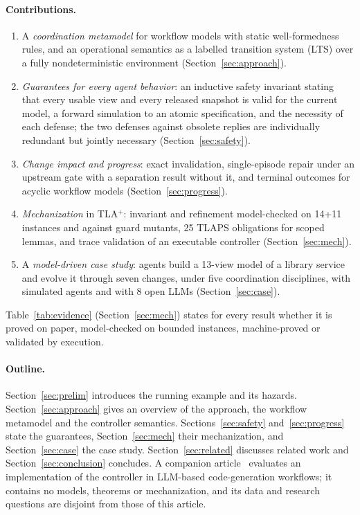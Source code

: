\documentclass[pdflatex,sn-mathphys-num]{sn-jnl}
\theoremstyle{thmstyleone}%
\theoremstyle{thmstyletwo}%
\theoremstyle{thmstylethree}%
\newcommand{\tla}{TLA$^+$}
\newcommand{\TLCExtBaselines}{14}
\newcommand{\ProvedObligations}{25}
\newcommand{\LlmModels}{8}
\newcommand{\TLCScaleBaselines}{11}
\begin{document}
\paragraph{Contributions.}
\begin{enumerate}
\item A \emph{coordination metamodel} for workflow models with static well-formedness rules, and an operational semantics as a labelled transition system (LTS) over a fully nondeterministic environment (Section~\ref{sec:approach}).
\item \emph{Guarantees for every agent behavior}: an inductive safety invariant stating that every usable view and every released snapshot is valid for the current model, a forward simulation to an atomic specification, and the necessity of each defense; the two defenses against obsolete replies are individually redundant but jointly necessary (Section~\ref{sec:safety}).
\item \emph{Change impact and progress}: exact invalidation, single-episode repair under an upstream gate with a separation result without it, and terminal outcomes for acyclic workflow models (Section~\ref{sec:progress}).
\item \emph{Mechanization} in \tla{}: invariant and refinement model-checked on \TLCExtBaselines{}+\TLCScaleBaselines{} instances and against guard mutants, \ProvedObligations{} TLAPS obligations for scoped lemmas, and trace validation of an executable controller (Section~\ref{sec:mech}).
\item A \emph{model-driven case study}: agents build a 13-view model of a library service and evolve it through seven changes, under five coordination disciplines, with simulated agents and with \LlmModels{} open LLMs (Section~\ref{sec:case}).
\end{enumerate}
Table~\ref{tab:evidence} (Section~\ref{sec:mech}) states for every result whether it is proved on paper, model-checked on bounded instances, machine-proved or validated by execution.

\paragraph{Outline.} Section~\ref{sec:prelim} introduces the running example and its hazards. Section~\ref{sec:approach} gives an overview of the approach, the workflow metamodel and the controller semantics. Sections~\ref{sec:safety} and~\ref{sec:progress} state the guarantees, Section~\ref{sec:mech} their mechanization, and Section~\ref{sec:case} the case study. Section~\ref{sec:related} discusses related work and Section~\ref{sec:conclusion} concludes. A companion article~\cite{babaei2026empirical} evaluates an implementation of the controller in LLM-based code-generation workflows; it contains no models, theorems or mechanization, and its data and research questions are disjoint from those of this article.
\end{document}
